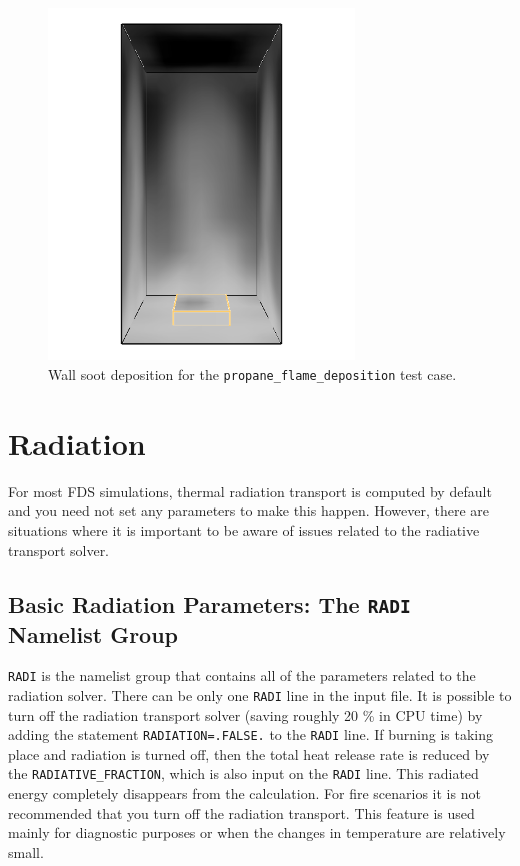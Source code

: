 \documentclass[11pt]{book}
\newcommand{\ct}{\tt\small}
\begin{document}
\begin{figure}[ht]
\centering
\includegraphics[width=3.2in]{SCRIPT_FIGURES/propane_flame_deposition}
\caption[Wall soot deposition for the {\ct propane\_flame\_deposition} test case]{Wall soot deposition for the {\ct propane\_flame\_deposition} test case.}
\label{soot_deposition}
\end{figure}













\chapter{Radiation}

For most FDS simulations, thermal radiation transport is computed by default and you need not set any
parameters to make this happen. However, there are situations where it is important to be aware of
issues related to the radiative transport solver.

\section{Basic Radiation Parameters: The \texorpdfstring{{\tt RADI}}{RADI} Namelist Group}
\label{info:RADI}

{\ct RADI} is the namelist group that contains all of the parameters related to the radiation solver. There can be only one
{\ct RADI} line in the input file. It is possible to turn off the radiation transport
solver (saving roughly 20 \% in CPU time) by adding the statement
{\ct RADIATION=.FALSE.} to the {\ct RADI} line.  If burning
is taking place and radiation is turned off, then the total heat
release rate is reduced by the {\ct RADIATIVE\_FRACTION}, which is
also input on the {\ct RADI} line. This radiated energy completely
disappears from the calculation. For fire scenarios it is not recommended that you turn off the
radiation transport. This feature is used mainly for diagnostic purposes or when the changes in
temperature are relatively small.
\end{document}

